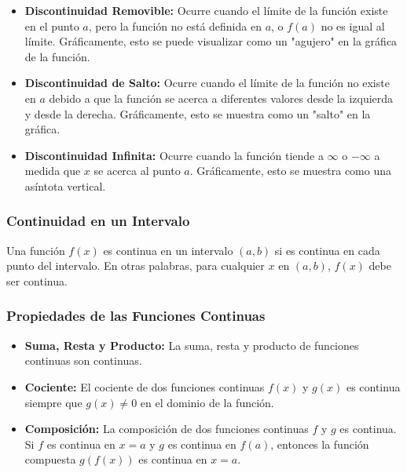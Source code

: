\begin{itemize}
    \item \textbf{Discontinuidad Removible:} Ocurre cuando el límite de la función existe en el punto \( a \), pero la función no está definida en \( a \), o \( f(a) \) no es igual al límite. Gráficamente, esto se puede visualizar como un "agujero" en la gráfica de la función.
    
    \item \textbf{Discontinuidad de Salto:} Ocurre cuando el límite de la función no existe en \( a \) debido a que la función se acerca a diferentes valores desde la izquierda y desde la derecha. Gráficamente, esto se muestra como un "salto" en la gráfica.
    
    \item \textbf{Discontinuidad Infinita:} Ocurre cuando la función tiende a \( \infty \) o \( -\infty \) a medida que \( x \) se acerca al punto \( a \). Gráficamente, esto se muestra como una asíntota vertical.
\end{itemize}

\subsubsection{Continuidad en un Intervalo}

Una función \( f(x) \) es continua en un intervalo \( (a, b) \) si es continua en cada punto del intervalo. En otras palabras, para cualquier \( x \) en \( (a, b) \), \( f(x) \) debe ser continua.

\subsubsection{Propiedades de las Funciones Continuas}

\begin{itemize}
    \item \textbf{Suma, Resta y Producto:} La suma, resta y producto de funciones continuas son continuas.
    
    \item \textbf{Cociente:} El cociente de dos funciones continuas \( f(x) \) y \( g(x) \) es continua siempre que \( g(x) \neq 0 \) en el dominio de la función.
    
    \item \textbf{Composición:} La composición de dos funciones continuas \( f \) y \( g \) es continua. Si \( f \) es continua en \( x = a \) y \( g \) es continua en \( f(a) \), entonces la función compuesta \( g(f(x)) \) es continua en \( x = a \).
\end{itemize}

